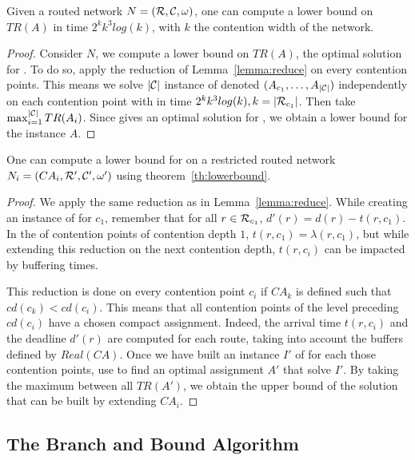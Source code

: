 \begin{theorem}\label{th:lowerbound}
Given a routed network $N = ({\cal R},{\cal C},\omega)$, one can compute a lower bound on $TR(A)$ in time $2^kk^3log(k)$, with $k$ the contention width of the network.
\end{theorem}
\begin{proof}
Consider $N$, we compute a lower bound on $TR(A)$, the optimal solution for \spall. To do so, apply the reduction of Lemma~\ref{lemma:reduce} on every contention points. This means we solve $|{\cal C}|$ instance of \wta denoted $(A_{c_1},\ldots,A_{|{\cal C}|})$ independently on each contention point with \ASPMLS in time $2^kk^3log(k), k = |{\cal R}_{c_1}|$. Then take $\max_{i=1}^{|{\cal C}|} TR(A_i)$. Since \ASPMLS gives an optimal solution for \wta, we obtain a lower bound for the instance $A$.
\end{proof}


\begin{corollary}\label{th:restrictedlower}
One can compute a lower bound for \spall on a restricted routed network $N_i = (CA_i,{\cal R}',{\cal C}',\omega')$ using theorem~\ref{th:lowerbound}.
\end{corollary}
\begin{proof}
We apply the same reduction as in Lemma~\ref{lemma:reduce}. While creating an instance of \wta for $c_1$, remember that for all $r \in {\cal R}_{c_1}$,  $d'(r) = d(r) - t(r,c_1)$. In the of contention points of contention depth $1$, $t(r,c_1) = \lambda(r,c_1)$, but while extending this reduction on the next contention depth, $t(r,c_i)$ can be impacted by buffering times.

This reduction is done on every contention point $c_i$ if $CA_k$ is defined such that $cd(c_k) < cd(c_i)$. This means that all contention points of the level preceding $cd(c_i)$ have a chosen compact assignment. Indeed, the arrival time $t(r,c_i)$ and the deadline $d'(r)$ are computed for each route, taking into account the buffers defined by $Real(CA)$.
Once we have built an instance $I'$ of \wta for each those contention points, use \ASPMLS to find an optimal assignment $A'$ that solve $I'$. By taking the maximum between all $TR(A')$, we obtain the upper bound of the solution that can be built by extending $CA_i$.
\end{proof}




\subsection{The Branch and Bound Algorithm}\label{sec:branchBound}

